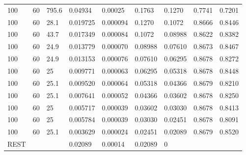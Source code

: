 \begin{small}
\begin{supertabular}{p{1.5cm}p{1.1cm}p{1.1cm}p{1.3cm}p{1.5cm}p{1.3cm}p{1.3cm}p{1.5cm}p{1.5cm}}
100 & 60 & 795.6 & 0.04934 & 0.00025 & 0.1763 & 0.1270 & 0.7741 & 0.7201 \\
100 & 60 & 28.1 & 0.019725 & 0.000094 & 0.1270 & 0.1072 & 0.8666 & 0.8446 \\
100 & 60 & 43.7 & 0.017349 & 0.000084 & 0.1072 & 0.08988 & 0.8622 & 0.8382 \\
100 & 60 & 24.9 & 0.013779 & 0.000070 & 0.08988 & 0.07610 & 0.8673 & 0.8467 \\
100 & 60 & 24.9 & 0.013153 & 0.000076 & 0.07610 & 0.06295 & 0.8678 & 0.8272 \\
100 & 60 & 25 & 0.009771 & 0.000063 & 0.06295 & 0.05318 & 0.8678 & 0.8448 \\
100 & 60 & 25.1 & 0.009520 & 0.000064 & 0.05318 & 0.04366 & 0.8679 & 0.8210 \\
100 & 60 & 25.1 & 0.007641 & 0.000052 & 0.04366 & 0.03602 & 0.8678 & 0.8250 \\
100 & 60 & 25 & 0.005717 & 0.000039 & 0.03602 & 0.03030 & 0.8678 & 0.8413 \\
100 & 60 & 25 & 0.005784 & 0.000039 & 0.03030 & 0.02451 & 0.8678 & 0.8091 \\
100 & 60 & 25.1 & 0.003629 & 0.000024 & 0.02451 & 0.02089 & 0.8679 & 0.8520 \\
REST &  &  & 0.02089 & 0.00014 & 0.02089 & 0 &  &  \\
\end{supertabular}
\end{small}

\clearpage

